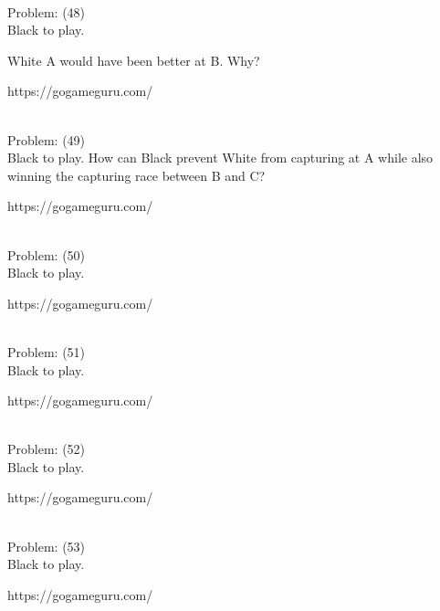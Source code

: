 \documentclass[11pt]{article}
\begin{document}
\begin{minipage}[t]{0.5\textwidth}
  {\centering
  
\\
Problem: (48)\\
Black to play.

White A would have been better at B. Why?

https://gogameguru.com/\\
  }
\end{minipage}
\begin{minipage}[t]{0.5\textwidth}
  {\centering
  
\\
Problem: (49)\\
Black to play. How can Black prevent White from capturing at A while also winning the capturing race between B and C?

https://gogameguru.com/\\
  }
\end{minipage}
\begin{minipage}[t]{0.5\textwidth}
  {\centering
  
\\
Problem: (50)\\
Black to play.

https://gogameguru.com/\\
  }
\end{minipage}
\begin{minipage}[t]{0.5\textwidth}
  {\centering
  
\\
Problem: (51)\\
Black to play.

https://gogameguru.com/\\
  }
\end{minipage}
\begin{minipage}[t]{0.5\textwidth}
  {\centering
  
\\
Problem: (52)\\
Black to play.

https://gogameguru.com/\\
  }
\end{minipage}
\begin{minipage}[t]{0.5\textwidth}
  {\centering
  
\\
Problem: (53)\\
Black to play.

https://gogameguru.com/\\
  }
\end{minipage}
\end{document}
